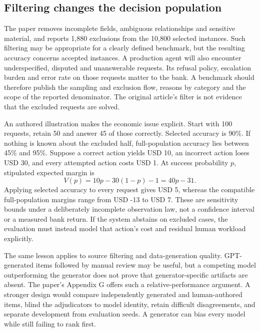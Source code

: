\subsection{Filtering changes the decision population}
\label{exec21:check-selection}
The paper removes incomplete fields, ambiguous relationships and sensitive material, and reports 1,880 exclusions from the 10,800 selected instances. Such filtering may be appropriate for a clearly defined benchmark, but the resulting accuracy concerns accepted instances. A production agent will also encounter underspecified, disputed and unanswerable requests. Its refusal policy, escalation burden and error rate on those requests matter to the bank. A benchmark should therefore publish the sampling and exclusion flow, reasons by category and the scope of the reported denominator. The original article's filter is not evidence that the excluded requests are solved.~\citep{exec21_causalitycheck,exec21_causalitycheck_reference}

An authored illustration makes the economic issue explicit. Start with 100 requests, retain 50 and answer 45 of those correctly. Selected accuracy is 90\%. If nothing is known about the excluded half, full-population accuracy lies between 45\% and 95\%. Suppose a correct action yields USD 10, an incorrect action loses USD 30, and every attempted action costs USD 1. At success probability $p$, stipulated expected margin is
\begin{equation}
 V(p)=10p-30(1-p)-1=40p-31.
 \label{exec21:check-value}
\end{equation}
Applying selected accuracy to every request gives USD 5, whereas the compatible full-population margins range from USD -13 to USD 7. These are sensitivity bounds under a deliberately incomplete observation law, not a confidence interval or a measured bank return. If the system abstains on excluded cases, the evaluation must instead model that action's cost and residual human workload explicitly.~\citep{exec21_causalitycheck_reference}

The same lesson applies to source filtering and data-generation quality. GPT-generated items followed by manual review may be useful, but a competing model outperforming the generator does not prove that generator-specific artifacts are absent. The paper's Appendix G offers such a relative-performance argument. A stronger design would compare independently generated and human-authored items, blind the adjudicators to model identity, retain difficult disagreements, and separate development from evaluation seeds. A generator can bias every model while still failing to rank first.~\citep{exec21_causalitycheck}

